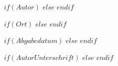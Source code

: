 $if(Autor)$  
\newcommand{\Autor}{$Autor$}
$else$
\newcommand{\Autor}{\textbf{(**Variable Autor definieren!**}}
$endif$

$if(Ort)$  
\newcommand{\Ort}{$Ort$}
$else$
\newcommand{\Ort}{\textbf{(**Variable Ort definieren!**}}
$endif$

$if(Abgabedatum)$  
\newcommand{\Abgabedatum}{$Abgabedatum$}
$else$
\newcommand{\Abgabedatum}{\textbf{(**Variable Abgabedatum definieren!**}}
$endif$

$if(AutorUnterschrift)$  
\newcommand{\AutorUnterschrift}{ \texttt{[image: \$AutorUnterschrift\$]}}
$else$
\newcommand{\AutorUnterschrift}{\textbf{(**Variable AutorUnterschrift definieren!**}}
$endif$

